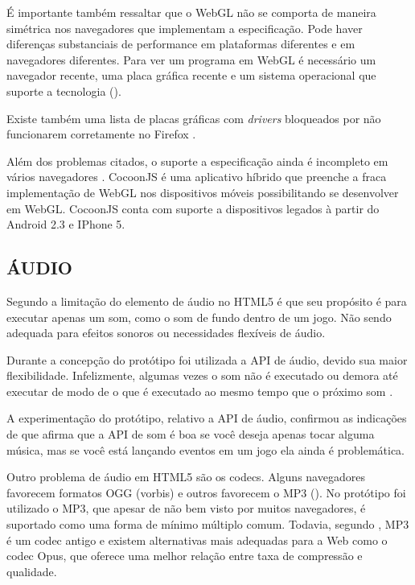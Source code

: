 É importante também ressaltar que o WebGL não se comporta de maneira
simétrica nos navegadores que implementam a especificação. Pode haver
diferenças substanciais de performance em plataformas diferentes e em
navegadores diferentes. Para ver um programa em WebGL é necessário um
navegador recente, uma placa gráfica recente e um sistema operacional
que suporte a tecnologia \autocite{html5mostwanted} ().

Existe também uma lista de placas gráficas com \textit{drivers}
bloqueados por não funcionarem corretamente no Firefox
\autocite[p.42]{3daps}.

Além dos problemas citados, o suporte a especificação ainda é
incompleto em vários navegadores .
CocoonJS é uma aplicativo híbrido que preenche a fraca implementação
de WebGL nos dispositivos móveis possibilitando se desenvolver em
WebGL. CocoonJS conta com suporte a dispositivos legados à partir do
Android 2.3 e IPhone 5.

\subsection{ÁUDIO}

Segundo \citet{html5mostwanted} a limitação do elemento de áudio no
HTML5 é que seu propósito é para executar apenas um som, como o som
de fundo dentro de um jogo. Não sendo adequada para efeitos sonoros
ou necessidades flexíveis de áudio.

Durante a concepção do protótipo foi utilizada a API de áudio, devido
sua maior flexibilidade. Infelizmente, algumas vezes o som não é
executado ou demora até executar de modo de o que é executado ao mesmo
tempo que o próximo som .

A experimentação do protótipo, relativo a API de áudio, confirmou
as indicações de \citet{html5mostwanted} que afirma que a API de som
é boa se você deseja apenas tocar alguma música, mas se você está
lançando eventos em um jogo ela ainda é problemática.

Outro problema de áudio em HTML5 são os codecs. Alguns navegadores
favorecem formatos OGG (vorbis) e outros favorecem o MP3 (). No
protótipo foi utilizado o MP3, que apesar de não bem visto por
muitos navegadores, é suportado como uma forma de mínimo múltiplo
comum. Todavia, segundo \citet{opus}, MP3 é um codec antigo e existem
alternativas mais adequadas para a Web como o codec Opus, que oferece
uma melhor relação entre taxa de compressão e qualidade.

